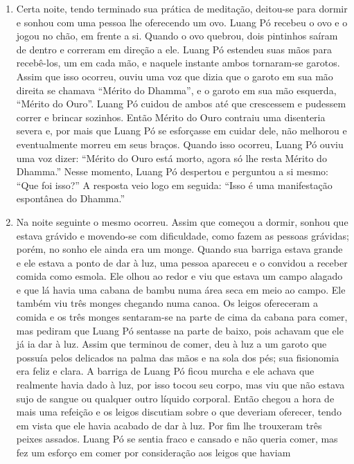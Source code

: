 \begin{enumerate}
\def\labelenumi{\arabic{enumi}.}
\item
  Certa noite, tendo terminado sua prática de meditação, deitou-se para
  dormir e sonhou com uma pessoa lhe oferecendo um ovo. Luang Pó recebeu
  o ovo e o jogou no chão, em frente a si. Quando o ovo quebrou, dois
  pintinhos saíram de dentro e correram em direção a ele. Luang Pó
  estendeu suas mãos para recebê-los, um em cada mão, e naquele instante
  ambos tornaram-se garotos. Assim que isso ocorreu, ouviu uma voz que
  dizia que o garoto em sua mão direita se chamava ``Mérito do Dhamma'',
  e o garoto em sua mão esquerda, ``Mérito do Ouro''. Luang Pó cuidou de
  ambos até que crescessem e pudessem correr e brincar sozinhos. Então
  Mérito do Ouro contraiu uma disenteria severa e, por mais que Luang Pó
  se esforçasse em cuidar dele, não melhorou e eventualmente morreu em
  seus braços. Quando isso ocorreu, Luang Pó ouviu uma voz dizer:
  ``Mérito do Ouro está morto, agora só lhe resta Mérito do Dhamma.''
  Nesse momento, Luang Pó despertou e perguntou a si mesmo: ``Que foi
  isso?'' A resposta veio logo em seguida: ``Isso é uma manifestação
  espontânea do Dhamma.''
\item
  Na noite seguinte o mesmo ocorreu. Assim que começou a dormir, sonhou
  que estava grávido e movendo-se com dificuldade, como fazem as pessoas
  grávidas; porém, no sonho ele ainda era um monge. Quando sua barriga
  estava grande e ele estava a ponto de dar à luz, uma pessoa apareceu e
  o convidou a receber comida como esmola. Ele olhou ao redor e viu que
  estava um campo alagado e que lá havia uma cabana de bambu numa área
  seca em meio ao campo. Ele também viu três monges chegando numa canoa.
  Os leigos ofereceram a comida e os três monges sentaram-se na parte de
  cima da cabana para comer, mas pediram que Luang Pó sentasse na parte
  de baixo, pois achavam que ele já ia dar à luz. Assim que terminou de
  comer, deu à luz a um garoto que possuía pelos delicados na palma das
  mãos e na sola dos pés; sua fisionomia era feliz e clara. A barriga de
  Luang Pó ficou murcha e ele achava que realmente havia dado à luz, por
  isso tocou seu corpo, mas viu que não estava sujo de sangue ou
  qualquer outro líquido corporal. Então chegou a hora de mais uma
  refeição e os leigos discutiam sobre o que deveriam oferecer, tendo em
  vista que ele havia acabado de dar à luz. Por fim lhe trouxeram três
  peixes assados. Luang Pó se sentia fraco e cansado e não queria comer,
  mas fez um esforço em comer por consideração aos leigos que haviam

\end{enumerate}
